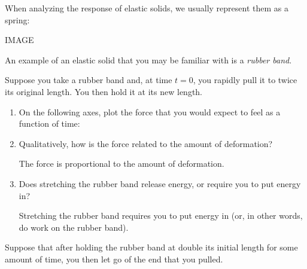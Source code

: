 \begin{activity}
\begin{ctqs}
\begin{solution}[2in]
			\end{solution}
		
\end{ctqs}

\begin{model}

	When analyzing the response of elastic solids, we usually represent them as a spring:
	
	IMAGE
	
	An example of an elastic solid that you may be familiar with is a \emph{rubber band}.
	
\end{model}

\begin{ctqs}
	\question Suppose you take a rubber band and, at time $t=0$, you rapidly pull it to twice its original length. You then hold it at its new length. \label{\labelbase:ctq:rubberbandstepstrain}
	
		\begin{enumerate}
			\item On the following axes, plot the force that you would expect to feel as a function of time:
			
				\begin{solution}[1.5in]
				\end{solution}
			
			\item Qualitatively, how is the force related to the amount of deformation?
			
				\begin{solution}[1in]
					The force is proportional to the amount of deformation.
				\end{solution}
			
			\item Does stretching the rubber band release energy, or require you to put energy in?
			
				\begin{solution}[1in]
					Stretching the rubber band requires you to put energy in (or, in other words, do work on the rubber band).
				\end{solution}
			
		\end{enumerate}
		
	\question Suppose that after holding the rubber band at double its initial length for some amount of time, you then let go of the end that you pulled.
	

\end{ctqs}
\end{activity}
